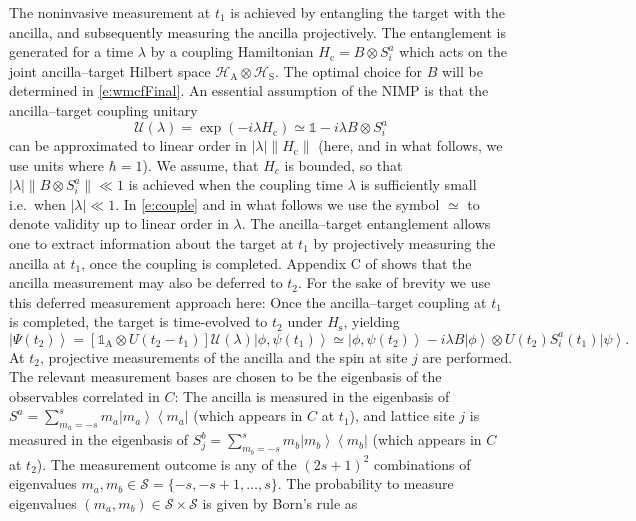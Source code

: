 \documentclass[epjST,numbook]{svjour}
\newcommand{\couple}{\mathscr{U}}
\newcommand{\ket}[1]{\left \vert #1 \right >}
\newcommand{\bra}[1]{\left < #1 \right \vert}
\begin{document}
The noninvasive measurement at $t_1$ is achieved by entangling the target with the ancilla, and subsequently measuring the ancilla projectively. The entanglement is generated for a time $\lambda$ by a coupling Hamiltonian $H_\text{c}= B \otimes S^a_i$ which acts on the joint ancilla--target Hilbert space $\mathscr{H}_\text{A} \otimes \mathscr{H}_\text{S}$. The optimal choice for $B$ will be determined in \eqref{e:wmcfFinal}. An essential assumption of the NIMP is that the ancilla--target coupling unitary
\begin{equation}\label{e:couple}
\couple(\lambda) = \exp(-i \lambda H_\text{c}) \simeq \mathds{1} - i\lambda B \otimes S^a_i 
\end{equation}
can be approximated to linear order in $|\lambda| \lVert H_\text{c} \rVert$ (here, and in what follows, we use units where $\hbar=1$). 
We assume, that $H_c$ is bounded, so that $|\lambda| \lVert B \otimes S^a_i \rVert \ll 1$ is achieved when the coupling time $\lambda$ is sufficiently small i.e.\ when $|\lambda| \ll 1$. In \eqref{e:couple} and in what follows we use the symbol $\simeq$ to denote validity up to linear order in $\lambda$.
The ancilla--target entanglement allows one to extract information about the target at $t_1$ by projectively measuring the ancilla at $t_1$, once the coupling is completed. Appendix C of \cite{Uhrich_etal} shows that the ancilla measurement may also be deferred to $t_2$. For the sake of brevity we use this deferred measurement approach here: Once the ancilla--target coupling at $t_1$ is completed, the target is time-evolved to $t_2$ under $H_\text{s}$, yielding
\begin{equation}\label{e:Psit2}
	\ket{\Psi(t_2)} = [\mathds{1}_\text{A} \otimes U(t_2-t_1)] \couple(\lambda) \ket{\phi,\psi(t_1)} \simeq \ket{\phi,\psi(t_2)} - i \lambda B \ket{\phi} \otimes  U(t_2)  S^a_i (t_1) \ket{\psi}.
\end{equation}
At $t_2$, projective measurements of the ancilla and the spin at site $j$ are performed. The relevant measurement bases are chosen to be the eigenbasis of the observables correlated in $C$: The ancilla is measured in the eigenbasis of ${S^a=\sum_{m_a =-s}^s m_a\ket{m_a}\!\bra{m_a}}$ (which appears in $C$ at $t_1$), and lattice site $j$ is measured in the eigenbasis of $S_j^b=\sum_{m_b =-s}^s m_b \ket{m_b}\!\bra{m_b}$ (which appears in $C$ at $t_2$). The measurement outcome is any of the $(2s+1)^2$ combinations of eigenvalues $m_a,m_b\in\mathscr{S}=\{-s,-s+1,\ldots,s\}$. The probability to measure eigenvalues $(m_a,m_b)\in \mathscr{S} \times \mathscr{S}$ is given by Born's rule as
\end{document}
